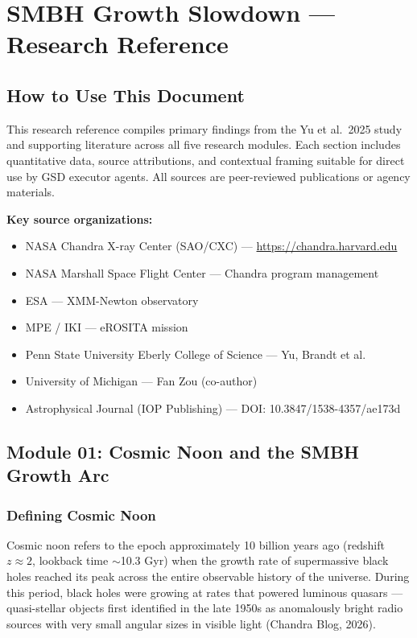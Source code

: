 \documentclass[11pt,letterpaper]{article}
\begin{document}
\section{SMBH Growth Slowdown --- Research Reference}

\subsection{How to Use This Document}

This research reference compiles primary findings from the Yu et al.\ 2025 study and supporting literature across all five research modules. Each section includes quantitative data, source attributions, and contextual framing suitable for direct use by GSD executor agents. All sources are peer-reviewed publications or agency materials.

\textbf{Key source organizations:}
\begin{itemize}
  \item NASA Chandra X-ray Center (SAO/CXC) --- \url{https://chandra.harvard.edu}
  \item NASA Marshall Space Flight Center --- Chandra program management
  \item ESA --- XMM-Newton observatory
  \item MPE / IKI --- eROSITA mission
  \item Penn State University Eberly College of Science --- Yu, Brandt et al.
  \item University of Michigan --- Fan Zou (co-author)
  \item Astrophysical Journal (IOP Publishing) --- DOI: 10.3847/1538-4357/ae173d
\end{itemize}

\subsection{Module 01: Cosmic Noon and the SMBH Growth Arc}

\subsubsection{Defining Cosmic Noon}

Cosmic noon refers to the epoch approximately 10 billion years ago (redshift $z \approx 2$, lookback time $\sim$10.3 Gyr) when the growth rate of supermassive black holes reached its peak across the entire observable history of the universe. During this period, black holes were growing at rates that powered luminous quasars --- quasi-stellar objects first identified in the late 1950s as anomalously bright radio sources with very small angular sizes in visible light (Chandra Blog, 2026).
\end{document}
